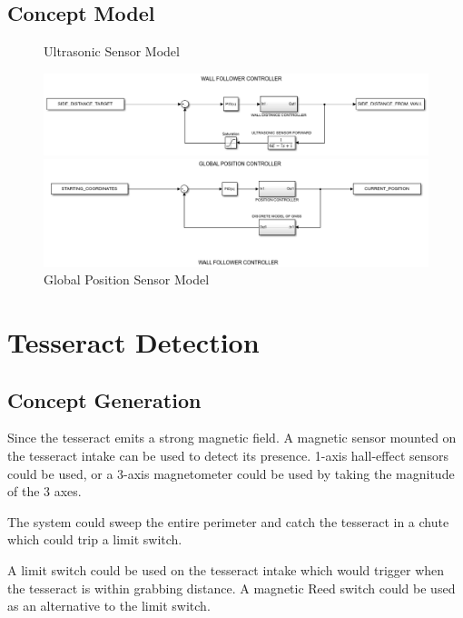 \documentclass[12pt]{article}
\begin{document}
\subsection{Concept Model}
\begin{figure}[htb!]
\begin{center}
\caption{Ultrasonic Sensor Model}
\includegraphics[scale=0.7]{Figures/simulink_ultrasonic}
\caption{Global Position Sensor Model}
\includegraphics[scale=0.7]{Figures/simulink_globalpos}
\end{center}
\end{figure}
\FloatBarrier

\section{Tesseract Detection}
\subsection{Concept Generation}
Since the tesseract emits a strong magnetic field. A magnetic sensor mounted on the tesseract intake can be used to detect its presence. 1-axis hall-effect sensors could be used, or a 3-axis magnetometer could be used by taking the magnitude of the 3 axes.

The system could sweep the entire perimeter and catch the tesseract in a chute which could trip a limit switch.

A limit switch could be used on the tesseract intake which would trigger when the tesseract is within grabbing distance. A magnetic Reed switch could be used as an alternative to the limit switch.
\end{document}

